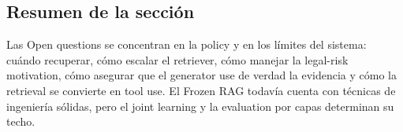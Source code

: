 \subsection{Resumen de la sección}

Las Open questions se concentran en la policy y en los límites del sistema: cuándo recuperar, cómo escalar el retriever, cómo manejar la legal-risk motivation, cómo asegurar que el generator use de verdad la evidencia y cómo la retrieval se convierte en tool use. El Frozen RAG todavía cuenta con técnicas de ingeniería sólidas, pero el joint learning y la evaluation por capas determinan su techo.
